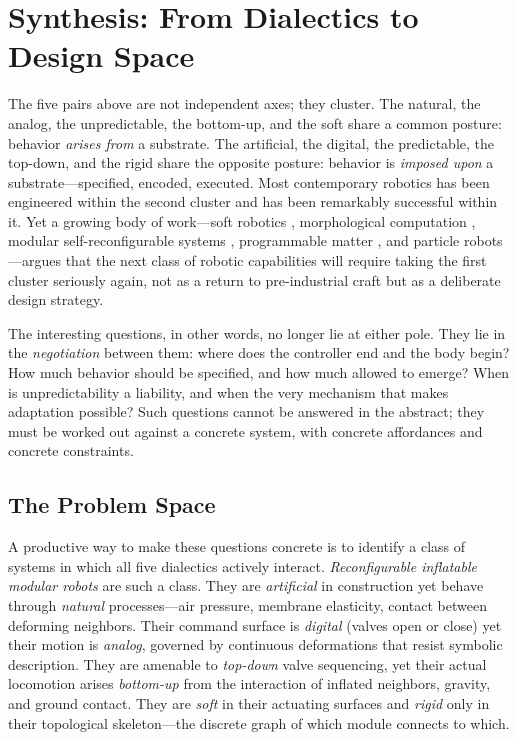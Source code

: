 \section{Synthesis: From Dialectics to Design Space}
\label{sec:synthesis}

The five pairs above are not independent axes; they cluster. The natural, the analog, the unpredictable, the bottom-up, and the soft share a common posture: behavior \textit{arises from} a substrate. The artificial, the digital, the predictable, the top-down, and the rigid share the opposite posture: behavior is \textit{imposed upon} a substrate---specified, encoded, executed. Most contemporary robotics has been engineered within the second cluster and has been remarkably successful within it. Yet a growing body of work---soft robotics \citep{rus2015design}, morphological computation \citep{pfeifer2007body, pfeifer2005new}, modular self-reconfigurable systems \citep{yim2007modular, romanishin2013m}, programmable matter \citep{cademartiri2015programmable}, and particle robots \citep{li2019particle}---argues that the next class of robotic capabilities will require taking the first cluster seriously again, not as a return to pre-industrial craft but as a deliberate design strategy.

The interesting questions, in other words, no longer lie at either pole. They lie in the \textit{negotiation} between them: where does the controller end and the body begin? How much behavior should be specified, and how much allowed to emerge? When is unpredictability a liability, and when the very mechanism that makes adaptation possible? Such questions cannot be answered in the abstract; they must be worked out against a concrete system, with concrete affordances and concrete constraints.

\subsection{The Problem Space}

A productive way to make these questions concrete is to identify a class of systems in which all five dialectics actively interact. \textit{Reconfigurable inflatable modular robots} are such a class. They are \textit{artificial} in construction yet behave through \textit{natural} processes---air pressure, membrane elasticity, contact between deforming neighbors. Their command surface is \textit{digital} (valves open or close) yet their motion is \textit{analog}, governed by continuous deformations that resist symbolic description. They are amenable to \textit{top-down} valve sequencing, yet their actual locomotion arises \textit{bottom-up} from the interaction of inflated neighbors, gravity, and ground contact. They are \textit{soft} in their actuating surfaces and \textit{rigid} only in their topological skeleton---the discrete graph of which module connects to which.

